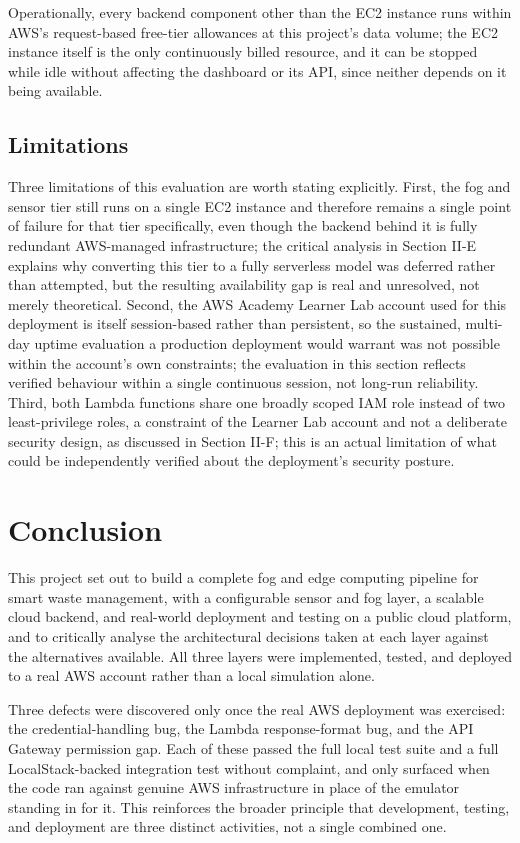 \documentclass[conference]{IEEEtran}
\begin{document}
Operationally, every backend component other than the EC2 instance runs within AWS's request-based free-tier allowances at this project's data volume; the EC2 instance itself is the only continuously billed resource, and it can be stopped while idle without affecting the dashboard or its API, since neither depends on it being available.

\subsection{Limitations}
Three limitations of this evaluation are worth stating explicitly. First, the fog and sensor tier still runs on a single EC2 instance and therefore remains a single point of failure for that tier specifically, even though the backend behind it is fully redundant AWS-managed infrastructure; the critical analysis in Section II-E explains why converting this tier to a fully serverless model was deferred rather than attempted, but the resulting availability gap is real and unresolved, not merely theoretical. Second, the AWS Academy Learner Lab account used for this deployment is itself session-based rather than persistent, so the sustained, multi-day uptime evaluation a production deployment would warrant was not possible within the account's own constraints; the evaluation in this section reflects verified behaviour within a single continuous session, not long-run reliability. Third, both Lambda functions share one broadly scoped IAM role instead of two least-privilege roles, a constraint of the Learner Lab account and not a deliberate security design, as discussed in Section II-F; this is an actual limitation of what could be independently verified about the deployment's security posture.

\section{Conclusion}
This project set out to build a complete fog and edge computing pipeline for smart waste management, with a configurable sensor and fog layer, a scalable cloud backend, and real-world deployment and testing on a public cloud platform, and to critically analyse the architectural decisions taken at each layer against the alternatives available. All three layers were implemented, tested, and deployed to a real AWS account rather than a local simulation alone.

Three defects were discovered only once the real AWS deployment was exercised: the credential-handling bug, the Lambda response-format bug, and the API Gateway permission gap. Each of these passed the full local test suite and a full LocalStack-backed integration test without complaint, and only surfaced when the code ran against genuine AWS infrastructure in place of the emulator standing in for it. This reinforces the broader principle that development, testing, and deployment are three distinct activities, not a single combined one.
\end{document}
